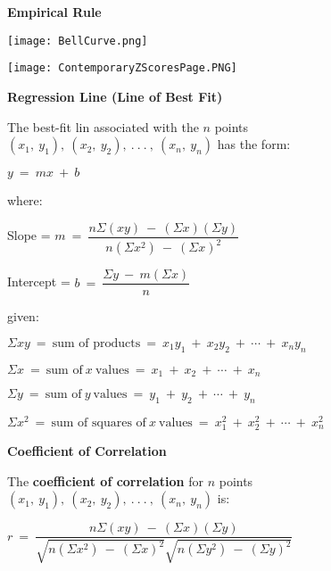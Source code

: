 \documentclass{article}
\begin{document}
\begin{large}
\textbf{Empirical Rule}

\texttt{[image: BellCurve.png]}

\newpage



\texttt{[image: ContemporaryZScoresPage.PNG]}

\newpage

\textbf{Regression Line (Line of Best Fit)}

\hspace{0.1in} The best-fit lin associated with the $n$ points $(x_{1},\ y_{1}),\ (x_{2},\ y_{2}),\ .\ .\ .\ ,\ (x_{n},\ y_{n})$ has the form:

\hspace{2.5in} $y\ =\ mx\ +\ b$

\hspace{0.1in} where:

\hspace{0.2in} Slope = $m\ =\ \dfrac{n\Sigma(xy)\ -\ (\Sigma x)(\Sigma y)}{n(\Sigma x^{2})\ -\ (\Sigma x)^{2}}$

\hspace{0.2in} Intercept = $b\ =\ \dfrac{\Sigma y\ -\ m(\Sigma x)}{n}$

\hspace{0.1in} given:

\hspace{0.2in} $\Sigma xy\ =\ \text{sum of products}\ =\ x_{1}y_{1}\ +\ x_{2}y_{2}\ +\ \cdots\ +\ x_{n}y_{n}$

\hspace{0.2in} $\Sigma x\ =\ \text{sum of}\ x\ \text{values}\ =\ x_{1}\ +\ x_{2}\ +\ \cdots\ +\ x_{n}$

\hspace{0.2in} $\Sigma y\ =\ \text{sum of}\ y\ \text{values}\ =\ y_{1}\ +\ y_{2}\ +\ \cdots\ +\ y_{n}$

\hspace{0.2in} $\Sigma x^{2}\ =\ \text{sum of squares of}\ x\ \text{values}\ =\ x^{2}_{1}\ +\ x^{2}_{2}\ +\ \cdots\ +\ x^{2}_{n}$

\textbf{Coefficient of Correlation}

\hspace{0.1in} The \textbf{coefficient of correlation} for $n$ points $(x_{1},\ y_{1}),\ (x_{2},\ y_{2}),\ .\ .\ .\ ,\ (x_{n},\ y_{n})$ is:

\hspace{2.0in} $r\ =\ \dfrac{n\Sigma(xy)\ -\ (\Sigma x)(\Sigma y)}{\sqrt{n(\Sigma x^{2})\ -\ (\Sigma x)^{2}}\sqrt{n(\Sigma y^{2})\ -\ (\Sigma y)^{2}}}$


\end{large}
\end{document}
